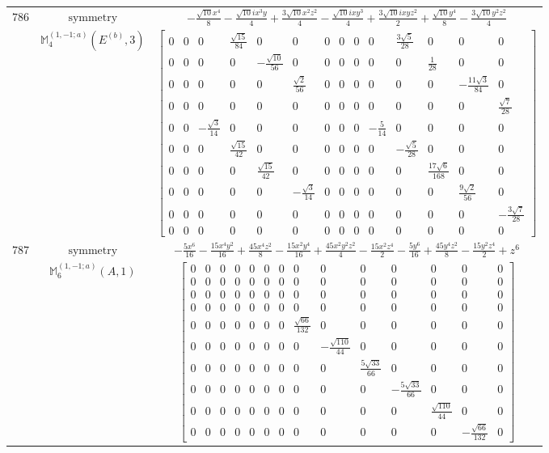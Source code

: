 \documentclass[fleqn,8pt,landscape]{jsarticle}
\begin{document}
\begin{longtable}{ccc}
$ 786 $ & $ \text{symmetry} $ & $ - \frac{\sqrt{10} x^{4}}{8} - \frac{\sqrt{10} i x^{3} y}{4} + \frac{3 \sqrt{10} x^{2} z^{2}}{4} - \frac{\sqrt{10} i x y^{3}}{4} + \frac{3 \sqrt{10} i x y z^{2}}{2} + \frac{\sqrt{10} y^{4}}{8} - \frac{3 \sqrt{10} y^{2} z^{2}}{4} $ \\
$  $ & $ \mathbb{M}_{4}^{(1,-1;a)}(E^{(b)},3) $ & $ \begin{bmatrix} 0 & 0 & 0 & \frac{\sqrt{15}}{84} & 0 & 0 & 0 & 0 & 0 & 0 & \frac{3 \sqrt{5}}{28} & 0 & 0 & 0 \\ 0 & 0 & 0 & 0 & - \frac{\sqrt{10}}{56} & 0 & 0 & 0 & 0 & 0 & 0 & \frac{1}{28} & 0 & 0 \\ 0 & 0 & 0 & 0 & 0 & \frac{\sqrt{2}}{56} & 0 & 0 & 0 & 0 & 0 & 0 & - \frac{11 \sqrt{3}}{84} & 0 \\ 0 & 0 & 0 & 0 & 0 & 0 & 0 & 0 & 0 & 0 & 0 & 0 & 0 & \frac{\sqrt{7}}{28} \\ 0 & 0 & - \frac{\sqrt{3}}{14} & 0 & 0 & 0 & 0 & 0 & 0 & - \frac{5}{14} & 0 & 0 & 0 & 0 \\ 0 & 0 & 0 & \frac{\sqrt{15}}{42} & 0 & 0 & 0 & 0 & 0 & 0 & - \frac{\sqrt{5}}{28} & 0 & 0 & 0 \\ 0 & 0 & 0 & 0 & \frac{\sqrt{15}}{42} & 0 & 0 & 0 & 0 & 0 & 0 & \frac{17 \sqrt{6}}{168} & 0 & 0 \\ 0 & 0 & 0 & 0 & 0 & - \frac{\sqrt{3}}{14} & 0 & 0 & 0 & 0 & 0 & 0 & \frac{9 \sqrt{2}}{56} & 0 \\ 0 & 0 & 0 & 0 & 0 & 0 & 0 & 0 & 0 & 0 & 0 & 0 & 0 & - \frac{3 \sqrt{7}}{28} \\ 0 & 0 & 0 & 0 & 0 & 0 & 0 & 0 & 0 & 0 & 0 & 0 & 0 & 0 \end{bmatrix} $ \\ \hline
$ 787 $ & $ \text{symmetry} $ & $ - \frac{5 x^{6}}{16} - \frac{15 x^{4} y^{2}}{16} + \frac{45 x^{4} z^{2}}{8} - \frac{15 x^{2} y^{4}}{16} + \frac{45 x^{2} y^{2} z^{2}}{4} - \frac{15 x^{2} z^{4}}{2} - \frac{5 y^{6}}{16} + \frac{45 y^{4} z^{2}}{8} - \frac{15 y^{2} z^{4}}{2} + z^{6} $ \\
$  $ & $ \mathbb{M}_{6}^{(1,-1;a)}(A,1) $ & $ \begin{bmatrix} 0 & 0 & 0 & 0 & 0 & 0 & 0 & 0 & 0 & 0 & 0 & 0 & 0 & 0 \\ 0 & 0 & 0 & 0 & 0 & 0 & 0 & 0 & 0 & 0 & 0 & 0 & 0 & 0 \\ 0 & 0 & 0 & 0 & 0 & 0 & 0 & 0 & 0 & 0 & 0 & 0 & 0 & 0 \\ 0 & 0 & 0 & 0 & 0 & 0 & 0 & 0 & 0 & 0 & 0 & 0 & 0 & 0 \\ 0 & 0 & 0 & 0 & 0 & 0 & 0 & \frac{\sqrt{66}}{132} & 0 & 0 & 0 & 0 & 0 & 0 \\ 0 & 0 & 0 & 0 & 0 & 0 & 0 & 0 & - \frac{\sqrt{110}}{44} & 0 & 0 & 0 & 0 & 0 \\ 0 & 0 & 0 & 0 & 0 & 0 & 0 & 0 & 0 & \frac{5 \sqrt{33}}{66} & 0 & 0 & 0 & 0 \\ 0 & 0 & 0 & 0 & 0 & 0 & 0 & 0 & 0 & 0 & - \frac{5 \sqrt{33}}{66} & 0 & 0 & 0 \\ 0 & 0 & 0 & 0 & 0 & 0 & 0 & 0 & 0 & 0 & 0 & \frac{\sqrt{110}}{44} & 0 & 0 \\ 0 & 0 & 0 & 0 & 0 & 0 & 0 & 0 & 0 & 0 & 0 & 0 & - \frac{\sqrt{66}}{132} & 0 \end{bmatrix} $ \\ \hline

\end{longtable}
\end{document}
